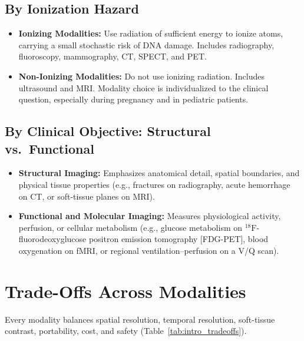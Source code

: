\subsection*{By Ionization Hazard}
\begin{itemize}
\item \textbf{Ionizing Modalities:} Use radiation of sufficient energy to ionize atoms, carrying a small stochastic risk of DNA damage. Includes radiography, fluoroscopy, mammography, CT, SPECT, and PET.
\item \textbf{Non-Ionizing Modalities:} Do not use ionizing radiation. Includes ultrasound and MRI. Modality choice is individualized to the clinical question, especially during pregnancy and in pediatric patients.
\end{itemize}

\subsection*{By Clinical Objective: Structural vs.\ Functional}
\begin{itemize}
\item \textbf{Structural Imaging:} Emphasizes anatomical detail, spatial boundaries, and physical tissue properties (e.g., fractures on radiography, acute hemorrhage on CT, or soft-tissue planes on MRI).
\item \textbf{Functional and Molecular Imaging:} Measures physiological activity, perfusion, or cellular metabolism (e.g., glucose metabolism on $^{18}\text{F}$-fluorodeoxyglucose positron emission tomography [FDG-PET], blood oxygenation on fMRI, or regional ventilation--perfusion on a V/Q scan).
\end{itemize}

\section{Trade-Offs Across Modalities}
Every modality balances spatial resolution, temporal resolution, soft-tissue contrast, portability, cost, and safety (Table~\ref{tab:intro_tradeoffs}).


